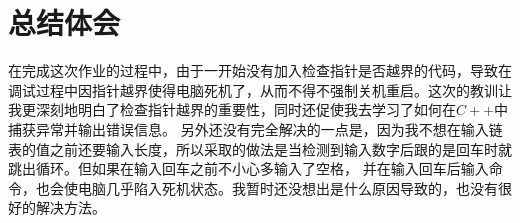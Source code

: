 \documentclass[UTF8]{ctexart}
\begin{document}
	\section{总结体会}
	\indent 在完成这次作业的过程中，由于一开始没有加入检查指针是否越界的代码，导致在调试过程中因指针越界使得电脑死机了，从而不得不强制关机重启。这次的教训让我更深刻地明白了检查指针越界的重要性，同时还促使我去学习了如何在$C++$中捕获异常并输出错误信息。
	\indent 另外还没有完全解决的一点是，因为我不想在输入链表的值之前还要输入长度，所以采取的做法是当检测到输入数字后跟的是回车时就跳出循环。但如果在输入回车之前不小心多输入了空格，
并在输入回车后输入命令，也会使电脑几乎陷入死机状态。我暂时还没想出是什么原因导致的，也没有很好的解决方法。


\end{document}
